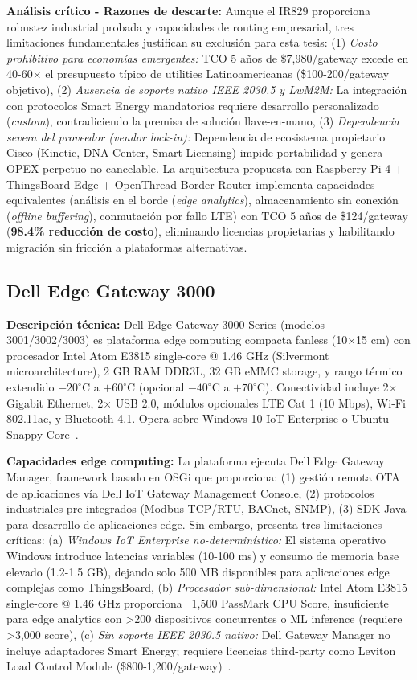 \textbf{Análisis crítico - Razones de descarte:} Aunque el IR829 proporciona robustez industrial probada y capacidades de routing empresarial, tres limitaciones fundamentales justifican su exclusión para esta tesis: (1) \textit{Costo prohibitivo para economías emergentes:} TCO 5 años de \$7,980/gateway excede en 40-60$\times$ el presupuesto típico de utilities Latinoamericanas (\$100-200/gateway objetivo), (2) \textit{Ausencia de soporte nativo IEEE 2030.5 y LwM2M:} La integración con protocolos Smart Energy mandatorios requiere desarrollo personalizado (\textit{custom}), contradiciendo la premisa de solución llave-en-mano, (3) \textit{Dependencia severa del proveedor (\textit{vendor lock-in}):} Dependencia de ecosistema propietario Cisco (Kinetic, DNA Center, Smart Licensing) impide portabilidad y genera OPEX perpetuo no-cancelable. La arquitectura propuesta con Raspberry Pi 4 + ThingsBoard Edge + OpenThread Border Router implementa capacidades equivalentes (análisis en el borde (\textit{edge analytics}), almacenamiento sin conexión (\textit{offline buffering}), conmutación por fallo LTE) con TCO 5 años de \$124/gateway (\textbf{98.4\% reducción de costo}), eliminando licencias propietarias y habilitando migración sin fricción a plataformas alternativas.

\subsection{Dell Edge Gateway 3000}
\label{sec:marco-dell-eg3000}

\textbf{Descripción técnica:} Dell Edge Gateway 3000 Series (modelos 3001/3002/3003) es plataforma edge computing compacta fanless (10$\times$15 cm) con procesador Intel Atom E3815 single-core @ 1.46 GHz (Silvermont microarchitecture), 2 GB RAM DDR3L, 32 GB eMMC storage, y rango térmico extendido $-20^\circ$C a $+60^\circ$C (opcional $-40^\circ$C a $+70^\circ$C). Conectividad incluye 2$\times$ Gigabit Ethernet, 2$\times$ USB 2.0, módulos opcionales LTE Cat 1 (10 Mbps), Wi-Fi 802.11ac, y Bluetooth 4.1. Opera sobre Windows 10 IoT Enterprise o Ubuntu Snappy Core~\cite{dellDellEdgeGateway2024}.

\textbf{Capacidades edge computing:} La plataforma ejecuta Dell Edge Gateway Manager, framework basado en OSGi que proporciona: (1) gestión remota OTA de aplicaciones vía Dell IoT Gateway Management Console, (2) protocolos industriales pre-integrados (Modbus TCP/RTU, BACnet, SNMP), (3) SDK Java para desarrollo de aplicaciones edge. Sin embargo, presenta tres limitaciones críticas: (a) \textit{Windows IoT Enterprise no-determinístico:} El sistema operativo Windows introduce latencias variables (10-100 ms) y consumo de memoria base elevado (1.2-1.5 GB), dejando solo 500 MB disponibles para aplicaciones edge complejas como ThingsBoard, (b) \textit{Procesador sub-dimensional:} Intel Atom E3815 single-core @ 1.46 GHz proporciona ~1,500 PassMark CPU Score, insuficiente para edge analytics con >200 dispositivos concurrentes o ML inference (requiere >3,000 score), (c) \textit{Sin soporte IEEE 2030.5 nativo:} Dell Gateway Manager no incluye adaptadores Smart Energy; requiere licencias third-party como Leviton Load Control Module (\$800-1,200/gateway)~\cite{dellDellIoTGateway2023}.

